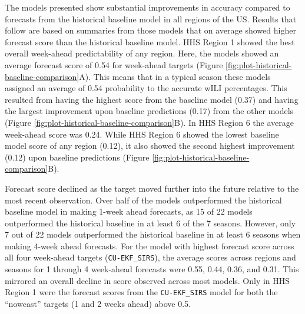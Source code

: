 \documentclass{article}\usepackage[]{graphicx}\usepackage[]{color}
\begin{document}
The models presented show substantial improvements in accuracy compared to forecasts from the historical baseline model in all regions of the US.
Results that follow are based on summaries from those models that on average showed higher forecast score than the historical baseline model.
HHS Region 1 showed the best overall week-ahead predictability of any region. Here, the models showed an average forecast score of 
0.54 
for week-ahead targets (Figure \ref{fig:plot-historical-baseline-comparison}A). 
This means that in a typical season these models assigned an average of 
0.54 
probability to the accurate wILI percentages.
This resulted from having the highest score from the baseline model 
(0.37) 
and having the largest improvement upon baseline predictions 
(0.17)
from the other models (Figure \ref{fig:plot-historical-baseline-comparison}B).  
In HHS Region 6 the average week-ahead score was 
0.24. 
While HHS Region 6 showed the lowest baseline model score of any region
(0.12), 
it also showed the second highest improvement
(0.12)
upon baseline predictions (Figure \ref{fig:plot-historical-baseline-comparison}B).





Forecast score declined as the target moved further into the future relative to the most recent observation.
Over half of the models outperformed the historical baseline model in making 1-week ahead forecasts, as 15 of 22 models outperformed the historical baseline in at least 6 of the 7 seasons.
However, only 7 out of 22 models outperformed the historical baseline in at least 6 seasons when making 4-week ahead forecasts.
For the model with highest forecast score across all four week-ahead targets ({\tt CU-EKF\_SIRS}), the average scores across regions and seasons for 1 through 4 week-ahead forecasts were 
0.55, 
0.44, 
0.36, and 
0.31.
This mirrored an overall decline in score observed across most models.
Only in HHS Region 1 were the forecast scores from the {\tt CU-EKF\_SIRS} model for both the ``nowcast'' targets (1 and 2 weeks ahead) above 0.5.
\end{document}
